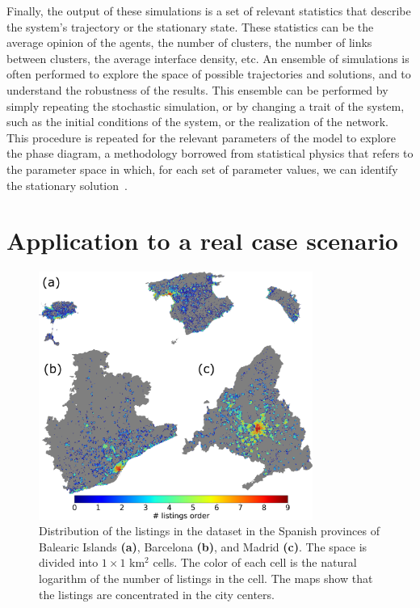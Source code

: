 Finally, the output of these simulations is a set of relevant statistics that describe the system's trajectory or the stationary state. These statistics can be the average opinion of the agents, the number of clusters, the number of links between clusters, the average interface density, etc. An ensemble of simulations is often performed to explore the space of possible trajectories and solutions, and to understand the robustness of the results. This ensemble can be performed by simply repeating the stochastic simulation, or by changing a trait of the system, such as the initial conditions of the system, or the realization of the network. This procedure is repeated for the relevant parameters of the model to explore the phase diagram, a methodology borrowed from statistical physics that refers to the parameter space in which, for each set of parameter values, we can identify the stationary solution~\cite{goldenfeld-1992}.

\section{\label{sec:Datasets} Application to a real case scenario}

\begin{figure}[ht]
    \centering
    \includegraphics[width=0.80\textwidth]{Figs/Introduction/adds_size_map.pdf}
    \caption[Listings distribution in space]{Distribution of the listings in the dataset in the Spanish provinces of Balearic Islands \textbf{(a)}, Barcelona \textbf{(b)}, and Madrid \textbf{(c)}. The space is divided into $1 \times 1$ km$^2$ cells. The color of each cell is the natural logarithm of the number of listings in the cell. The maps show that the listings are concentrated in the city centers. }
    \label{fig:maps_adds}
\end{figure}

